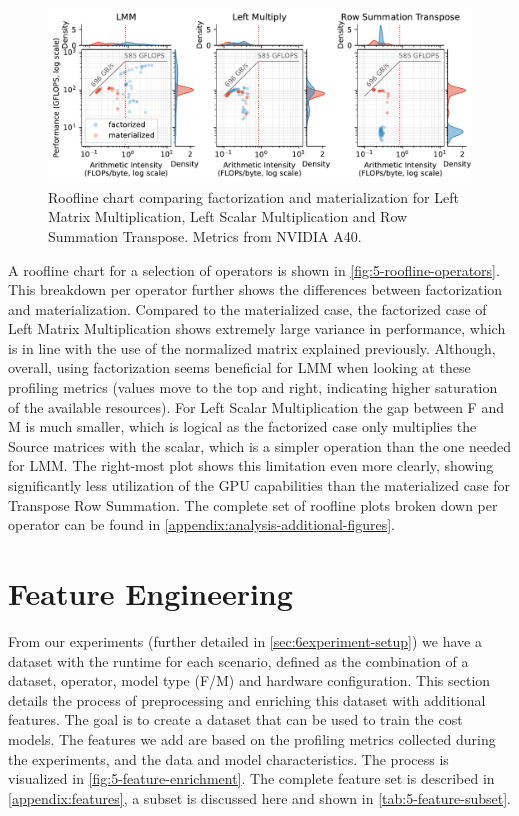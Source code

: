 \begin{figure}[ht]
    \centering
    \includegraphics[width=\linewidth]{chapters/05_cost_estimation/figures/roofline-operators.pdf}
    \caption[Roofline chart per operator]{Roofline chart comparing factorization and materialization for Left Matrix Multiplication, Left Scalar Multiplication and Row Summation Transpose. Metrics from NVIDIA A40.}
    \label{fig:5-roofline-operators}
\end{figure}

A roofline chart for a selection of operators is shown in \autoref{fig:5-roofline-operators}. This breakdown per operator further shows the differences between factorization and materialization. Compared to the materialized case, the factorized case of Left Matrix Multiplication shows extremely large variance in performance, which is in line with the use of the normalized matrix explained previously. Although, overall, using factorization seems beneficial for LMM when looking at these profiling metrics (values move to the top and right, indicating higher saturation of the available resources). For Left Scalar Multiplication the gap between F and M is much smaller, which is logical as the factorized case only multiplies the Source matrices with the scalar, which is a simpler operation than the one needed for LMM. The right-most plot shows this limitation even more clearly, showing significantly less utilization of the GPU capabilities than the materialized case for Transpose Row Summation. The complete set of roofline plots broken down per operator can be found in \autoref{appendix:analysis-additional-figures}.

\section{Feature Engineering}
\label{sec:5-feature-engineering}
From our experiments (further detailed in \autoref{sec:6experiment-setup}) we have a dataset with the runtime for each scenario, defined as the combination of a dataset, operator, model type (F/M) and hardware configuration. This section details the process of preprocessing and enriching this dataset with additional features. The goal is to create a dataset that can be used to train the cost models. The features we add are based on the profiling metrics collected during the experiments, and the data and model characteristics. The process is visualized in \autoref{fig:5-feature-enrichment}. The complete feature set is described in \autoref{appendix:features}, a subset is discussed here and shown in \autoref{tab:5-feature-subset}.

